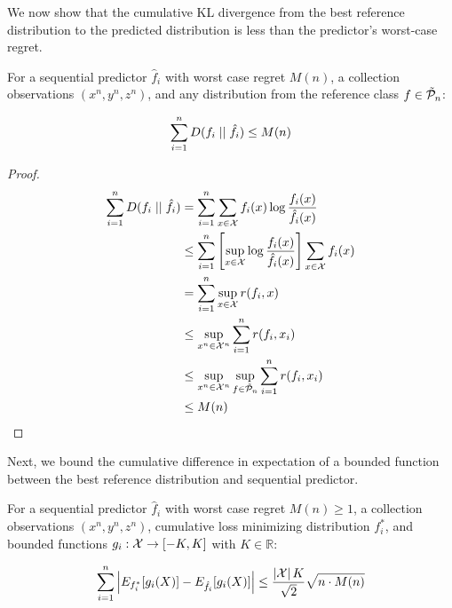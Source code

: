 We now show that the cumulative KL divergence from the best reference distribution to the predicted distribution is less than the predictor's worst-case regret.

\begin{lemma}\label{lemma:kl}
For a sequential predictor $\hat{f}_i$ with worst case regret $M(n)$, a collection observations $(x^n,y^n,z^n)$, and any distribution from the reference class $f \in \tilde{\mathcal{P}}_n$:

\begin{equation}
\sum_{i=1}^n D(f_i \mid \mid \hat{f}_i)\le M(n)
\end{equation}
\end{lemma}

\begin{proof}
\begin{align}
\sum_{i=1}^n D(f_i \mid \mid \hat{f}_i)
&= \sum_{i=1}^n \sum_{x\in\mathcal{X}} f_i(x)
    \log \frac{f_i(x)}{\hat{f}_i(x)} \\
&\le \sum_{i=1}^n
    \left[ \sup_{x\in\mathcal{X}}
    \log \frac{f_i(x)}{\hat{f}_i(x)} \right]
    \sum_{x\in\mathcal{X}} f_i(x) \\
&= \sum_{i=1}^n \sup_{x\in\mathcal{X}} r(f_i,x) \\
&\le \sup_{x^n\in\mathcal{X}^n} \sum_{i=1}^n r(f_i,x_i)\\
&\le \sup_{x^n\in\mathcal{X}^n} \sup_{f\in\tilde{\mathcal{P}}_n} \sum_{i=1}^n r(f_i,x_i)\\
&\le M(n)
\end{align}
\end{proof}

Next, we bound the cumulative difference in expectation of a bounded function between the best reference distribution and sequential predictor.

\begin{lemma} \label{lemma:g_func}
For a sequential predictor $\hat{f}_i$ with worst case regret $M(n)\ge 1$, a collection observations $(x^n,y^n,z^n)$, cumulative loss minimizing distribution $f^*_i$, and bounded functions $g_i:\mathcal{X}\rightarrow [-K,K]$ with $K\in\mathbb{R}$:

\begin{equation}
\sum_{i=1}^n \left| E_{f^*_i}[g_i(X)] -
    E_{\hat{f}_i}[g_i(X)] \right| \le
    \frac{\left|\mathcal{X}\right|K}{\sqrt{2}}\sqrt{n \cdot M(n)}
\end{equation}
\end{lemma}

